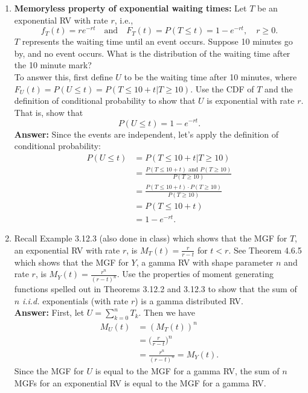 \documentclass{article}
\begin{document}
\begin{enumerate}
        \item \textbf{Memoryless property of exponential waiting times: }Let $T$ be an exponential RV with rate $r$, i.e.,
            \[f_T(t) = re^{-rt}    \quad\text{and}\quad F_T(t) = P(T \leq t) = 1-e^{-rt},  \quad r \geq 0.\]
        $T$  represents the waiting time until an event occurs. Suppose 10 minutes go by, and no event occurs. What is the distribution of the waiting time after the 10 minute mark?\\
        To answer this, first define $U$ to be the waiting time after 10 minutes, where $F_U(t) = P(U \leq t) = P(T \leq 10+t|T \geq 10)$. Use the CDF of $T$ and the definition of conditional probability to show that $U$ is exponential with rate $r$. That is, show that
            \[P(U \leq t) = 1-e^{-rt}.\]
        \textbf{Answer: }Since the events are independent, let's apply the definition of conditional probability:
            \begin{align*}
                P(U \leq t) &= P(T \leq 10+t|T \geq 10)\\
                &= \frac{\text{$P(T \leq 10+t)$ and $P(T \geq 10)$}}{P(T \geq 10)}\\
                &= \frac{P(T \leq 10+t) \cdot P(T \geq 10)}{P(T \geq 10)}\\
                &= P(T \leq 10+t)\\
                &= 1-e^{-rt}.
            \end{align*}
        
        \item Recall Example 3.12.3 (also done in class) which shows that the MGF for $T$, an exponential RV with rate $r$, is $M_T(t) = \frac{r}{r-t}$ for $t < r$. See Theorem 4.6.5 which shows that the MGF for $Y$, a gamma RV with shape parameter $n$ and rate $r$, is $M_Y(t) = \frac{r^n}{(r-t)^n}$. Use the properties of moment generating functions spelled out in Theorems 3.12.2 and 3.12.3 to show that the sum of $n$ \textit{i.i.d.} exponentials (with rate $r$) is a gamma distributed RV. \\
        \textbf{Answer: }First, let $U=\sum_{k=0}^n T_k$. Then we have
            \begin{align*}
                M_U(t) &= (M_T(t))^n\\
                &= \bigg(\frac{r}{r-t}\bigg)^n\\
                &= \frac{r^n}{(r-t)^n} = M_Y(t).
            \end{align*}
        Since the MGF for $U$ is equal to the MGF for a gamma RV, the sum of $n$ MGFs for an exponential RV is equal to the MGF for a gamma RV.\\
        

\end{enumerate}
\end{document}
